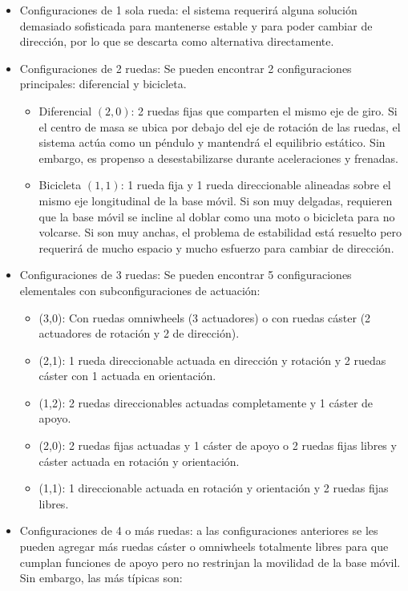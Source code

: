 \begin{itemize}
	\item Configuraciones de 1 sola rueda: el sistema requerirá alguna solución demasiado sofisticada para mantenerse estable y para poder cambiar de dirección, por lo que se descarta como alternativa directamente.
	\item Configuraciones de 2 ruedas: Se pueden encontrar 2 configuraciones principales: diferencial y bicicleta.
	\begin{itemize}
		\item Diferencial $(2, 0)$: 2 ruedas fijas que comparten  el mismo eje de giro. Si el centro de masa se ubica por debajo del eje de rotación de las ruedas, el sistema actúa como un péndulo y mantendrá el equilibrio estático. Sin embargo, es propenso a desestabilizarse durante aceleraciones y frenadas.
		\item Bicicleta $(1, 1)$: 1 rueda fija y 1 rueda direccionable alineadas sobre el mismo eje longitudinal de la base móvil. Si son muy delgadas, requieren que la base móvil se incline al doblar como una moto o bicicleta para no volcarse. Si son muy anchas, el problema de estabilidad está resuelto pero requerirá de mucho espacio y mucho esfuerzo para cambiar de dirección.
	\end{itemize}
	\item Configuraciones de 3 ruedas: Se pueden encontrar 5 configuraciones elementales con subconfiguraciones de actuación:
	\begin{itemize}
		\item (3,0): Con ruedas omniwheels (3 actuadores) o con ruedas cáster (2 actuadores de rotación y 2 de dirección). 
		\item(2,1): 1 rueda direccionable actuada en dirección y rotación y 2 ruedas cáster con 1 actuada en orientación.
		\item(1,2): 2 ruedas direccionables actuadas completamente y 1 cáster de apoyo.
		\item(2,0): 2 ruedas fijas actuadas y 1 cáster de apoyo o 2 ruedas fijas libres y cáster actuada en rotación y orientación.
		\item(1,1): 1 direccionable actuada en rotación y orientación y 2 ruedas fijas libres.
	\end{itemize}
	\item Configuraciones de 4 o más ruedas: a las configuraciones anteriores se les pueden agregar más ruedas cáster o omniwheels totalmente libres para que cumplan funciones de apoyo pero no restrinjan la movilidad de la base móvil. Sin embargo, las más típicas son:

\end{itemize}
